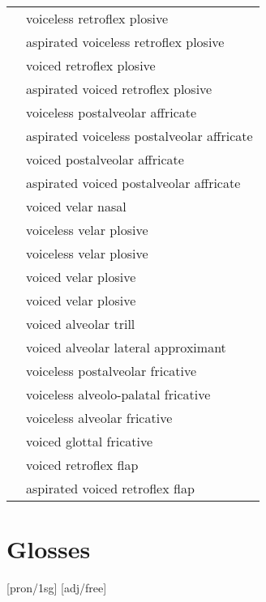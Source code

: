 \documentclass{article}
\begin{document}
\begin{xltabular}{\textwidth}{lL}
   & voiceless retroflex plosive \\
   & aspirated voiceless retroflex plosive \\
   & voiced retroflex plosive \\
   & aspirated voiced retroflex plosive \\
  \ipa{\t{\textteshlig}} & voiceless postalveolar affricate \\
   & aspirated voiceless postalveolar affricate \\
  \ipa{\t{\textdyoghlig}} & voiced postalveolar affricate \\
   & aspirated voiced postalveolar affricate \\
   & voiced velar nasal \\
   & voiceless velar plosive \\
   & voiceless velar plosive \\
   & voiced velar plosive \\
   & voiced velar plosive \\
   & voiced alveolar trill \\
   & voiced alveolar lateral approximant \\
   & voiceless postalveolar fricative \\
   & voiceless alveolo-palatal fricative \\
   & voiceless alveolar fricative \\
   & voiced glottal fricative \\
   & voiced retroflex flap \\
   & aspirated voiced retroflex flap \\
\end{xltabular}

\newpage\section{Glosses}

\ex[lingstyle=custom_nlevel]
\begingl
{}[pron/{\sc 1sg}]
[adj/free]
\endgl
\xe
\end{document}
